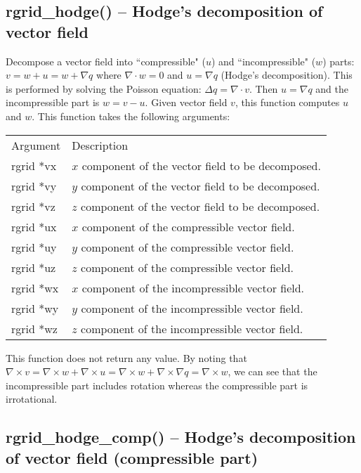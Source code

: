 \documentclass[12pt,letterpaper]{report}
\begin{document}
\subsection{rgrid\_hodge() -- Hodge's decomposition of vector field}

Decompose a vector field into ``compressible" ($u$) and ``incompressible" ($w$) parts: $v = w + u = w + \nabla q$ where $\nabla\cdot w = 0$ and $u = \nabla q$ (Hodge's decomposition). This is performed by solving the Poisson equation: $\Delta q = \nabla\cdot v$. Then $u = \nabla q$ and the incompressible part is $w = v - u$. Given vector field $v$, this function computes $u$ and $w$. This function takes the following arguments:
\begin{longtable}{p{} p{}}
Argument & Description\\
\cline{1-2}
rgrid *vx & $x$ component of the vector field to be decomposed.\\
rgrid *vy & $y$ component of the vector field to be decomposed.\\
rgrid *vz & $z$ component of the vector field to be decomposed.\\
rgrid *ux & $x$ component of the compressible vector field.\\
rgrid *uy & $y$ component of the compressible vector field.\\
rgrid *uz & $z$ component of the compressible vector field.\\
rgrid *wx & $x$ component of the incompressible vector field.\\
rgrid *wy & $y$ component of the incompressible vector field.\\
rgrid *wz & $z$ component of the incompressible vector field.\\
\end{longtable}
\noindent
This function does not return any value. By noting that $\nabla\times v = \nabla\times w + \nabla\times u = \nabla\times w + \nabla\times\nabla q = \nabla\times w$, we can see that the incompressible part includes rotation whereas the compressible part is irrotational.

\subsection{rgrid\_hodge\_comp() -- Hodge's decomposition of vector field (compressible part)}
\end{document}
